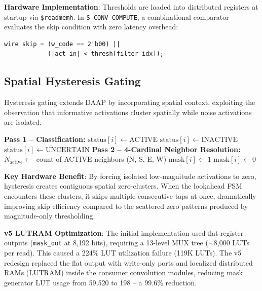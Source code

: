 \documentclass[conference]{IEEEtran}
\begin{document}
\textbf{Hardware Implementation}: Thresholds are loaded into distributed registers at startup via \texttt{\$readmemh}. In \texttt{S\_CONV\_COMPUTE}, a combinational comparator evaluates the skip condition with zero latency overhead:
\begin{verbatim}
wire skip = (w_code == 2'b00) ||
            (|act_in| < thresh[filter_idx]);
\end{verbatim}

\subsection{Spatial Hysteresis Gating}
\label{sec:hysteresis}

Hysteresis gating extends DAAP by incorporating spatial context, exploiting the observation that informative activations cluster spatially while noise activations are isolated.

\begin{algorithm}[H]
\caption{Spatial Hysteresis Mask Generation}
\label{alg:hyst}
\begin{algorithmic}[1]
\STATE \textbf{Pass 1 -- Classification:}
        \STATE $\text{status}[i] \gets \text{ACTIVE}$
        \STATE $\text{status}[i] \gets \text{INACTIVE}$
    \ELSE
        \STATE $\text{status}[i] \gets \text{UNCERTAIN}$
    \ENDIF
\ENDFOR
\STATE \textbf{Pass 2 -- 4-Cardinal Neighbor Resolution:}
    \STATE $N_{\text{active}} \gets$ count of ACTIVE neighbors (N, S, E, W)
        \STATE $\text{mask}[i] \gets 1$ 
    \ELSE
        \STATE $\text{mask}[i] \gets 0$ 
    \ENDIF
\ENDFOR
\end{algorithmic}
\end{algorithm}

\textbf{Key Hardware Benefit}: By forcing isolated low-magnitude activations to zero, hysteresis creates contiguous spatial zero-clusters. When the lookahead FSM encounters these clusters, it skips multiple consecutive taps at once, dramatically improving skip efficiency compared to the scattered zero patterns produced by magnitude-only thresholding.

\textbf{v5 LUTRAM Optimization}: The initial implementation used flat register outputs (\texttt{mask\_out} at 8,192 bits), requiring a 13-level MUX tree ($\sim$8,000 LUTs per read). This caused a 224\% LUT utilization failure (119K LUTs). The v5 redesign replaced the flat output with write-only ports and localized distributed RAMs (LUTRAM) inside the consumer convolution modules, reducing mask generator LUT usage from 59,520 to 198 -- a 99.6\% reduction.
\end{document}
